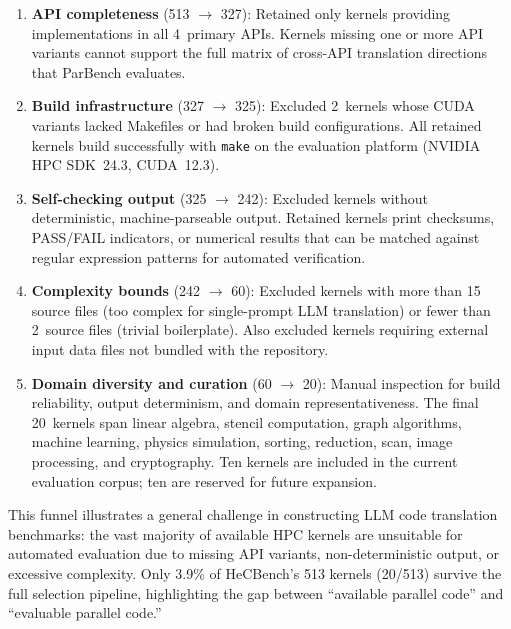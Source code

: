 \begin{enumerate}
  \item \textbf{API completeness} (513 $\rightarrow$ 327): Retained only kernels
    providing implementations in all 4~primary APIs. Kernels missing one or more
    API variants cannot support the full matrix of cross-API translation
    directions that ParBench evaluates.

  \item \textbf{Build infrastructure} (327 $\rightarrow$ 325): Excluded 2~kernels
    whose CUDA variants lacked Makefiles or had broken build configurations.
    All retained kernels build successfully with \texttt{make} on the evaluation
    platform (NVIDIA HPC SDK~24.3, CUDA~12.3).

  \item \textbf{Self-checking output} (325 $\rightarrow$ 242): Excluded kernels
    without deterministic, machine-parseable output. Retained kernels print
    checksums, PASS/FAIL indicators, or numerical results that can be matched
    against regular expression patterns for automated verification.

  \item \textbf{Complexity bounds} (242 $\rightarrow$ 60): Excluded kernels with
    more than 15 source files (too complex for single-prompt LLM translation) or
    fewer than 2~source files (trivial boilerplate). Also excluded kernels
    requiring external input data files not bundled with the repository.

  \item \textbf{Domain diversity and curation} (60 $\rightarrow$ 20): Manual
    inspection for build reliability, output determinism, and domain
    representativeness. The final 20~kernels span linear algebra, stencil
    computation, graph algorithms, machine learning, physics simulation, sorting,
    reduction, scan, image processing, and cryptography. Ten kernels are included
    in the current evaluation corpus; ten are reserved for future expansion.
\end{enumerate}

This funnel illustrates a general challenge in constructing LLM code translation
benchmarks: the vast majority of available HPC kernels are unsuitable for
automated evaluation due to missing API variants, non-deterministic output, or
excessive complexity. Only 3.9\% of HeCBench's 513 kernels (20/513) survive the
full selection pipeline, highlighting the gap between ``available parallel code''
and ``evaluable parallel code.''

